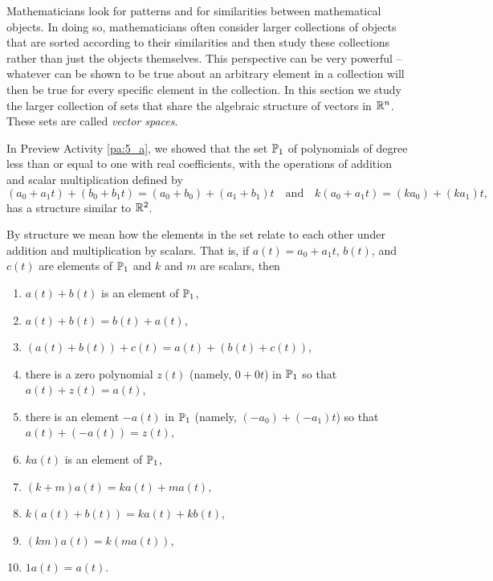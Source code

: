 
Mathematicians look for patterns and for similarities between mathematical objects. In doing so, mathematicians often consider larger collections of objects that are sorted according to their similarities and then study these collections rather than just the objects themselves. This perspective can be very powerful -- whatever can be shown to be true about an arbitrary element in a collection will then be true for every specific element in the collection. In this section we study the larger collection of sets that share the algebraic structure of vectors in $\mathbb{R}^n$. These sets are called  \emph{vector spaces}.

In Preview Activity \ref{pa:5_a}, we showed that the set $\mathbb{P}_1$ of polynomials of degree less than or equal to one with real coefficients, with the operations of addition and scalar multiplication defined by 
\[(a_0+a_1t)+(b_0+b_1t) = (a_0+b_0) + (a_1+b_1)t \ \ \ \text{ and } \ \ \ k(a_0+a_1t) = (ka_0) + (ka_1)t,\]
has a structure similar to $\mathbb{R}^2$.

By structure we mean how the elements in the set relate to each other under addition and multiplication by scalars. That is, if $a(t)=a_0+a_1t$, $b(t)$, and $c(t)$ are elements of $\mathbb{P}_1$ and $k$ and $m$ are scalars, then 
\begin{enumerate}
\item $a(t) + b(t)$ is an element of $\mathbb{P}_1$,
\item $a(t)+b(t) = b(t) + a(t)$,
\item $(a(t)+b(t)) + c(t) = a(t) + (b(t)+c(t))$,
\item there is a zero polynomial $z(t)$ (namely, $0+0t$) in $\mathbb{P}_1$ so that $a(t) + z(t) = a(t)$,
\item there is an element $-a(t)$ in $\mathbb{P}_1$ (namely, $(-a_0)+(-a_1)t$) so that $a(t) + (-a(t)) = z(t)$,
\item $k a(t)$ is an element of $\mathbb{P}_1$,
\item $(k+m) a(t) = ka(t) + ma(t)$,
\item $k(a(t)+b(t)) = ka(t) + kb(t)$,
\item $(km) a(t) = k(m a(t))$,
\item $1 a(t) = a(t)$.
\end{enumerate}

